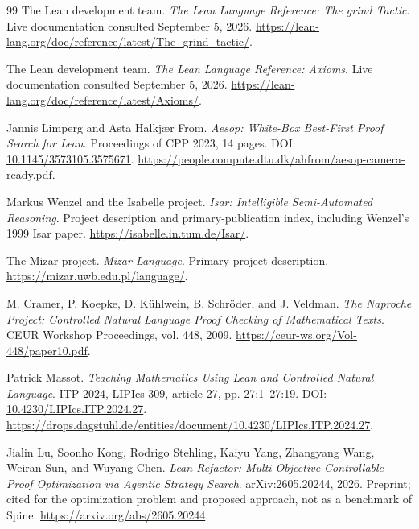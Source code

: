 \documentclass[11pt,letterpaper]{article}
\theoremstyle{definition}
\theoremstyle{remark}
\newcommand{\Spine}{Spine}
\begin{document}
\begin{thebibliography}{99}
The Lean development team.
\textit{The Lean Language Reference: The grind Tactic}.
Live documentation consulted September 5, 2026.
\url{https://lean-lang.org/doc/reference/latest/The--grind--tactic/}.

The Lean development team.
\textit{The Lean Language Reference: Axioms}.
Live documentation consulted September 5, 2026.
\url{https://lean-lang.org/doc/reference/latest/Axioms/}.

Jannis Limperg and Asta Halkjær From.
\textit{Aesop: White-Box Best-First Proof Search for Lean}.
Proceedings of CPP 2023, 14 pages.
DOI: \href{https://doi.org/10.1145/3573105.3575671}{10.1145/3573105.3575671}.
\url{https://people.compute.dtu.dk/ahfrom/aesop-camera-ready.pdf}.

Markus Wenzel and the Isabelle project.
\textit{Isar: Intelligible Semi-Automated Reasoning}.
Project description and primary-publication index, including Wenzel's 1999 Isar paper.
\url{https://isabelle.in.tum.de/Isar/}.

The Mizar project.
\textit{Mizar Language}.
Primary project description.
\url{https://mizar.uwb.edu.pl/language/}.

M. Cramer, P. Koepke, D. Kühlwein, B. Schröder, and J. Veldman.
\textit{The Naproche Project: Controlled Natural Language Proof Checking of Mathematical Texts}.
CEUR Workshop Proceedings, vol. 448, 2009.
\url{https://ceur-ws.org/Vol-448/paper10.pdf}.

Patrick Massot.
\textit{Teaching Mathematics Using Lean and Controlled Natural Language}.
ITP 2024, LIPIcs 309, article 27, pp. 27:1--27:19.
DOI: \href{https://doi.org/10.4230/LIPIcs.ITP.2024.27}{10.4230/LIPIcs.ITP.2024.27}.
\url{https://drops.dagstuhl.de/entities/document/10.4230/LIPIcs.ITP.2024.27}.

Jialin Lu, Soonho Kong, Rodrigo Stehling, Kaiyu Yang, Zhangyang Wang, Weiran Sun, and Wuyang Chen.
\textit{Lean Refactor: Multi-Objective Controllable Proof Optimization via Agentic Strategy Search}.
arXiv:2605.20244, 2026. Preprint; cited for the optimization problem and proposed approach, not as a benchmark of \Spine{}.
\url{https://arxiv.org/abs/2605.20244}.
\end{thebibliography}
\end{document}

